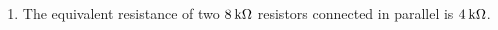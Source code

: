 {\begin{mdframed}[linewidth=4, leftmargin=40, rightmargin=40]
\begin{exercise}
\begin{enumerate}[noitemsep, label=\textbf{Step} \textbf{\arabic*}. ]
          
          \item  
          \label{m38776*id650261}The equivalent resistance of two \begin{math}8\phantom{\rule{2pt}{0ex}}\mathrm{k}\Omega \end{math} resistors connected in parallel is \begin{math}4\phantom{\rule{2pt}{0ex}}\mathrm{k}\Omega \end{math}. \par 
          \end{enumerate}
         

    \end{exercise}
    \end{mdframed}
    }
    \noindent
  \label{m38776*eip-994}\vspace{.5cm} 
      
